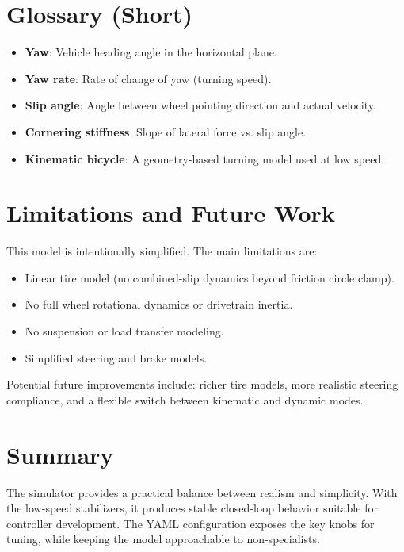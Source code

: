 \documentclass[11pt]{article}
\begin{document}
\section{Glossary (Short)}
\begin{itemize}
\item \textbf{Yaw}: Vehicle heading angle in the horizontal plane.
\item \textbf{Yaw rate}: Rate of change of yaw (turning speed).
\item \textbf{Slip angle}: Angle between wheel pointing direction and actual velocity.
\item \textbf{Cornering stiffness}: Slope of lateral force vs. slip angle.
\item \textbf{Kinematic bicycle}: A geometry-based turning model used at low speed.
\end{itemize}

\section{Limitations and Future Work}
This model is intentionally simplified. The main limitations are:

\begin{itemize}
\item Linear tire model (no combined-slip dynamics beyond friction circle clamp).
\item No full wheel rotational dynamics or drivetrain inertia.
\item No suspension or load transfer modeling.
\item Simplified steering and brake models.
\end{itemize}

Potential future improvements include: richer tire models, more realistic steering compliance, and a flexible switch between kinematic and dynamic modes.

\section{Summary}
The simulator provides a practical balance between realism and simplicity. With the low-speed stabilizers, it produces stable closed-loop behavior suitable for controller development. The YAML configuration exposes the key knobs for tuning, while keeping the model approachable to non-specialists.
\end{document}
